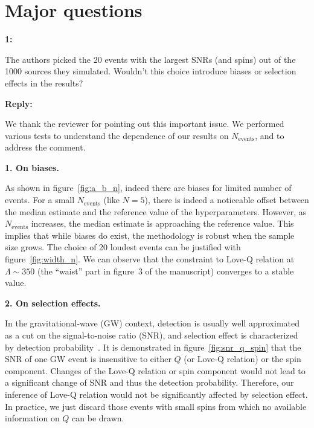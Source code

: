 \documentclass[11pt]{article}
\newenvironment{reviewercomment}[1]{
    \vspace{1em}
    \noindent \textbf{#1:} \itshape
}{
    \par\vspace{0.5em}
}
\newenvironment{authorresponse}{
    \noindent \textbf{Reply:} \normalfont
}{
    \par\vspace{1.5em}
}
\begin{document}
\section*{Major questions}
\begin{reviewercomment}{1}
    The authors picked the 20 events with the largest SNRs (and spins) out of the 1000 sources they simulated. Wouldn't this choice introduce biases or selection effects in the results? 
\end{reviewercomment}


\begin{authorresponse}
    
    We thank the reviewer for pointing out this important issue. We performed various tests to understand the dependence of our results on $N_{\text{events}}$, and to address the comment.
    
    {\bf 1. On biases.}
    
    As shown in
    figure~\ref{fig:a_b_n}, indeed there are biases for limited number of
    events. For a small $N_{\text{events}}$ (like $N=5$), there is indeed a
    noticeable offset between the median estimate and the reference value 
    of the hyperparameters.
    However, as $N_{\text{events}}$ increases, the median estimate is
    approaching the reference value. This implies that while biases do exist,
    the methodology is robust when the sample size grows. The choice of 20 loudest
    events can be justified with figure~\ref{fig:width_n}. We can observe that
    the constraint to Love-Q relation at $\Lambda \sim 350$ (the ``waist'' part
    in figure~3 of the manuscript) converges to a stable value. 

    {\bf 2. On selection effects.}

    In the gravitational-wave (GW) context, detection is usually well
    approximated as a cut on the signal-to-noise ratio (SNR), and
    selection effect is characterized by detection
    probability~\cite{LIGOScientific:2016, Mandel2018, Thrane2019}. It is
    demonstrated in figure~\ref{fig:snr_q_spin} that the SNR of one GW event is
    insensitive to either $Q$ (or Love-Q relation) or the spin component.
    Changes of the Love-Q relation or spin component would not lead to a significant change of SNR and
    thus the
    detection probability. Therefore,
    our
    inference of Love-Q relation would not be significantly affected by
    selection effect. In practice, we just discard those events with small spins
    from which no available information on $Q$ can be drawn. 
    

\end{authorresponse}
\end{document}
